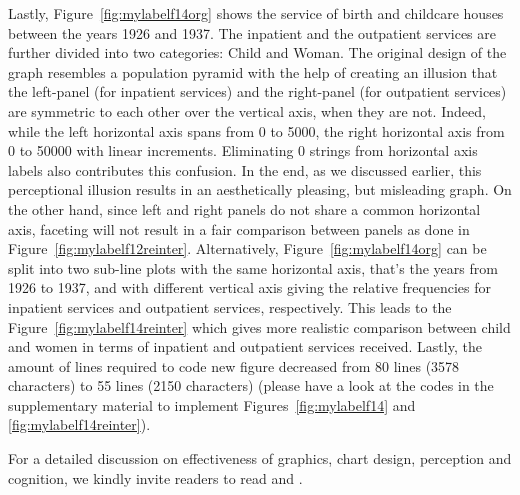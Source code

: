 Lastly, Figure~\ref{fig:mylabelf14org} shows the service of birth and childcare houses between the years 1926  and 1937. 
The inpatient and the outpatient services are further divided into two categories: Child and Woman. The original design of the graph resembles a population pyramid with the help of creating an illusion that the left-panel (for inpatient services) and  the right-panel (for outpatient services) are symmetric to each other over the vertical axis, when they are not. Indeed, while  the left horizontal axis spans from 0 to 5000, the right horizontal axis  from 0 to 50000 with linear increments. Eliminating 0 strings from horizontal axis labels also contributes this confusion. In the end, as we discussed earlier, this perceptional illusion results in an aesthetically pleasing, but misleading graph. On the other hand, since left and right panels do not share a common horizontal axis, faceting will not result in a fair comparison between panels as done in Figure~\ref{fig:mylabelf12reinter}. Alternatively, Figure~\ref{fig:mylabelf14org} can be split into two sub-line plots with the same horizontal axis, that's the years from 1926 to 1937, and with different vertical axis giving the relative frequencies for inpatient services and outpatient services, respectively. This leads to the Figure~\ref{fig:mylabelf14reinter} which gives more realistic comparison between child and women in terms of inpatient and outpatient services received. Lastly, the amount of lines required to code new figure decreased from 80 lines (3578 characters) to 55 lines 
(2150 characters) (please have a look at the  codes  in the supplementary material to implement Figures~\ref{fig:mylabelf14} and \ref{fig:mylabelf14reinter}).

For a detailed discussion on effectiveness of graphics, chart design, perception and cognition, we kindly invite readers to read \cite{cleveland1986experiment} and \cite{vanderplas2020testing}.

